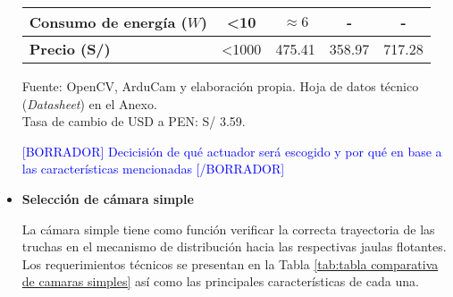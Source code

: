 \begin{itemize}
\begin{savenotes}
\begin{mytable}[H]
\begin{tabular}{l|c|c|c|c|}
			\multicolumn{1}{|l|}{
				\begin{minipage}{\myforthmaxsizeofcontenttable}	
					\textbf{Consumo de energía ($W$)}
				\end{minipage}
			} & <10 & $\approx6$ & - & - \\ \hline
			\multicolumn{1}{|l|}{
				\begin{minipage}{\myforthmaxsizeofcontenttable}	
					\textbf{Precio (S/)}
				\end{minipage}
			} & <1000 & 475.41 & 358.97 & 717.28 \\ \hline
		\end{tabular}
		\begin{flushleft}	
			Fuente: OpenCV, ArduCam y elaboración propia. Hoja de datos técnico (\textit{Datasheet}) en el Anexo.\\
			Tasa de cambio de USD a PEN: S/ 3.59.
		\end{flushleft}
	\end{mytable}
	\end{savenotes}
	
	\textcolor{blue}{[BORRADOR] Decicisión de qué actuador será escogido y por qué en base a las características mencionadas [/BORRADOR]}
	
	\item \textbf{Selección de cámara simple}
	
	La cámara simple tiene como función verificar la correcta trayectoria de las truchas en el mecanismo de distribución hacia las respectivas jaulas flotantes. Los requerimientos técnicos se presentan en la Tabla \ref{tab:tabla comparativa de camaras simples} así como las principales características de cada una.
	

\end{itemize}
